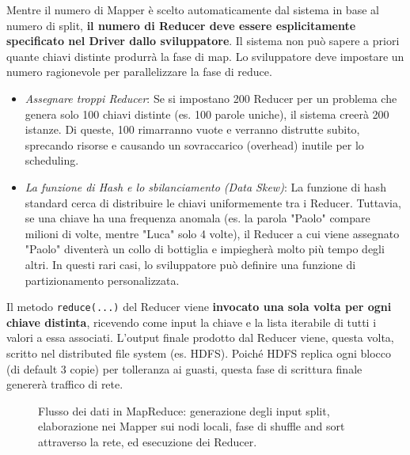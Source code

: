 \begin{remark}
Mentre il numero di Mapper è scelto automaticamente dal sistema in base al numero di split, \textbf{il numero di Reducer deve essere esplicitamente specificato nel Driver dallo sviluppatore}.
Il sistema non può sapere a priori quante chiavi distinte produrrà la fase di map. Lo sviluppatore deve impostare un numero ragionevole per parallelizzare la fase di reduce.
\begin{itemize}
    \item \textit{Assegnare troppi Reducer}: Se si impostano 200 Reducer per un problema che genera solo 100 chiavi distinte (es. 100 parole uniche), il sistema creerà 200 istanze. Di queste, 100 rimarranno vuote e verranno distrutte subito, sprecando risorse e causando un sovraccarico (overhead) inutile per lo scheduling.
    \item \textit{La funzione di Hash e lo sbilanciamento (Data Skew)}: La funzione di hash standard cerca di distribuire le chiavi uniformemente tra i Reducer. Tuttavia, se una chiave ha una frequenza anomala (es. la parola "Paolo" compare milioni di volte, mentre "Luca" solo 4 volte), il Reducer a cui viene assegnato "Paolo" diventerà un collo di bottiglia e impiegherà molto più tempo degli altri. In questi rari casi, lo sviluppatore può definire una funzione di partizionamento personalizzata.
\end{itemize}
\end{remark}

Il metodo \texttt{reduce(...)} del Reducer viene \textbf{invocato una sola volta per ogni chiave distinta}, ricevendo come input la chiave e la lista iterabile di tutti i valori a essa associati. 
L'output finale prodotto dal Reducer viene, questa volta, scritto nel distributed file system (es. HDFS). Poiché HDFS replica ogni blocco (di default 3 copie) per tolleranza ai guasti, questa fase di scrittura finale genererà traffico di rete.

\begin{figure}[H]
    \centering
    \caption{Flusso dei dati in MapReduce: generazione degli input split, elaborazione nei Mapper sui nodi locali, fase di shuffle and sort attraverso la rete, ed esecuzione dei Reducer.}
    \label{fig:mapreduce-data-flow}
\end{figure}

